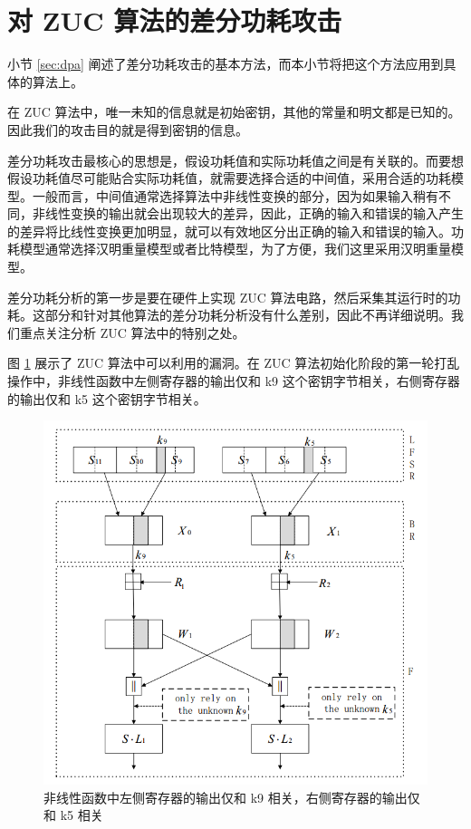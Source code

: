 \section{对 ZUC 算法的差分功耗攻击} %
\label{sec:zuc_attack}

小节 \ref{sec:dpa} 阐述了差分功耗攻击的基本方法，而本小节将把这个方法应用到具体的算法上。

在 ZUC 算法中，唯一未知的信息就是初始密钥，其他的常量和明文都是已知的。因此我们的攻击目的就是得到密钥的信息。

差分功耗攻击最核心的思想是，假设功耗值和实际功耗值之间是有关联的。而要想假设功耗值尽可能贴合实际功耗值，就需要选择合适的中间值，采用合适的功耗模型。一般而言，中间值通常选择算法中非线性变换的部分，因为如果输入稍有不同，非线性变换的输出就会出现较大的差异，因此，正确的输入和错误的输入产生的差异将比线性变换更加明显，就可以有效地区分出正确的输入和错误的输入。功耗模型通常选择汉明重量模型或者比特模型，为了方便，我们这里采用汉明重量模型。

\vspace*{\baselineskip}

差分功耗分析的第一步是要在硬件上实现 ZUC 算法电路，然后采集其运行时的功耗。这部分和针对其他算法的差分功耗分析没有什么差别，因此不再详细说明。我们重点关注分析 ZUC 算法中的特别之处。

\vspace*{\baselineskip}

图 \ref{fig:zuc_attack} 展示了 ZUC 算法中可以利用的漏洞。在 ZUC 算法初始化阶段的第一轮打乱操作中，非线性函数中左侧寄存器的输出仅和 k9 这个密钥字节相关，右侧寄存器的输出仅和 k5 这个密钥字节相关。 \cite{zuc_attack_tangming}

\begin{figure}[htbp]
    \centering
    \includegraphics[height=.5\textheight]{../images/zuc_attack.png}
    \caption{非线性函数中左侧寄存器的输出仅和 k9 相关，右侧寄存器的输出仅和 k5 相关\cite{zuc_attack_tangming}}
    \label{fig:zuc_attack}

\end{figure}

